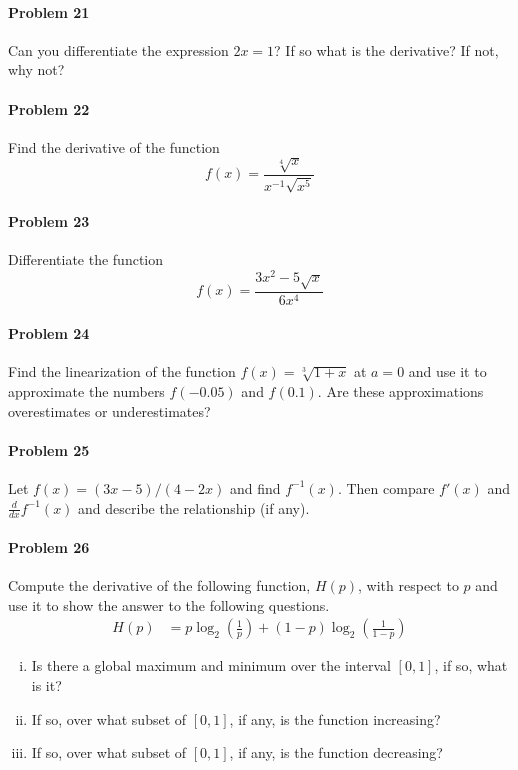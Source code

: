 \documentclass[a4paper, 11pt]{article}
\begin{document}
\paragraph{Problem 21}
Can you differentiate the expression $2x = 1$? If so what is the derivative?  If not, why not?

\paragraph{Problem 22} Find the derivative of the function
\[
	f(x) = \frac{\sqrt[4]{x}}{x^{-1} \sqrt{x^5}}
\]


\paragraph{Problem 23} Differentiate the function
\[
	f(x) = \frac{3x^2 - 5\sqrt{x} }{ 6x^4 }
\]


\paragraph{Problem 24}
Find the linearization of the function $f(x) = \sqrt[3]{1+x}$ at $a=0$ and use it to approximate the numbers $f(-0.05)$ and $f(0.1)$.
Are these approximations overestimates or underestimates?

\paragraph{Problem 25}
Let $f(x) = (3x-5)/(4-2x)$ and find $f^{-1}(x)$.  Then compare $f'(x)$ and $\frac{d}{dx} f^{-1}(x)$ and describe the relationship (if any).


\paragraph{Problem 26}
Compute the derivative of the following function, $H(p)$, with respect to $p$ and use it to show the answer to the following questions.
\begin{align}
    H(p) &= p \log_2 \left(\frac{1}{p} \right) + (1-p)\log_2 \left(\frac{1}{1-p} \right)  \nonumber
\end{align}
\begin{enumerate}[(i)]
	\item Is there a global maximum and minimum over the interval $[0,1]$, if so, what is it?
	\item If so, over what subset of $[0,1]$, if any, is the function increasing?
	\item If so, over what subset of $[0,1]$, if any, is the function decreasing?
\end{enumerate}
\end{document}
